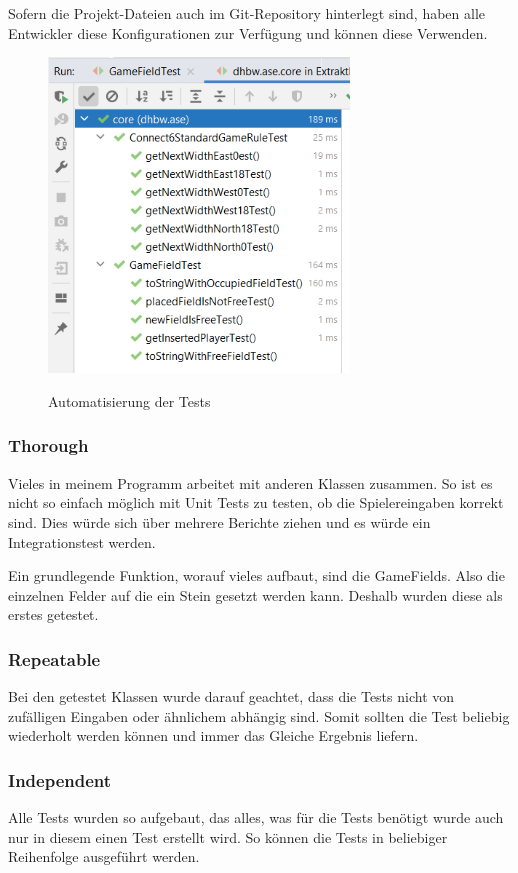 \documentclass[12pt]{article}
\begin{document}
Sofern die Projekt-Dateien auch im Git-Repository hinterlegt sind, haben alle Entwickler diese Konfigurationen zur Verfügung und können diese Verwenden.


\begin{figure}[H]
\centering
{\includegraphics[width=8cm]{Bilder/TestResults}}
\caption{Automatisierung der Tests}
\label{fig:TestResults}
\end{figure}


\newpage

\subsubsection{Thorough}
Vieles in meinem Programm arbeitet mit anderen Klassen zusammen. So ist es nicht so einfach möglich mit Unit Tests zu testen, ob die Spielereingaben korrekt sind. Dies würde sich über mehrere Berichte ziehen und es würde ein Integrationstest werden. 

Ein grundlegende Funktion, worauf vieles aufbaut, sind die GameFields. Also die einzelnen Felder auf die ein Stein gesetzt werden kann. Deshalb wurden diese als erstes getestet.


\subsubsection{Repeatable}
Bei den getestet Klassen wurde darauf geachtet, dass die Tests nicht von zufälligen Eingaben oder ähnlichem abhängig sind. Somit sollten die Test beliebig wiederholt werden können und immer das Gleiche Ergebnis liefern.

\subsubsection{Independent}
Alle Tests wurden so aufgebaut, das alles, was für die Tests benötigt wurde auch nur in diesem einen Test erstellt wird. So können die Tests in beliebiger Reihenfolge ausgeführt werden.
\end{document}
